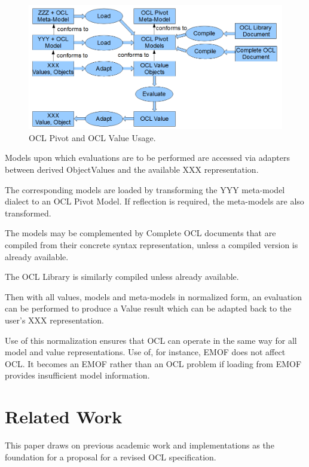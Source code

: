 \documentclass{eceasst}
\begin{document}
\begin{figure}
  \begin{center}
    \includegraphics[width=5.0in]{Usage.png}
  \end{center}
  \caption{OCL Pivot and OCL Value Usage.}
  \label{fig:Usage}
\end{figure}

Models upon which evaluations are to be performed are accessed via adapters between derived ObjectValues and the available XXX representation.

The corresponding models are loaded by transforming the YYY meta-model dialect to an OCL Pivot Model. If reflection is required, the meta-models are also transformed.

The models may be complemented by Complete OCL documents that are compiled from their concrete syntax representation, unless a compiled version is already available.

The OCL Library is similarly compiled unless already available.

Then with all values, models and meta-models in normalized form, an evaluation can be performed to produce a Value result which can be adapted back to the user's XXX representation.  

Use of this normalization ensures that OCL can operate in the same way for all model and value representations. Use of, for instance, EMOF does not affect OCL. It becomes an EMOF rather than an OCL problem if loading from EMOF provides insufficient model information.

\section{Related Work}

This paper draws on previous academic work and implementations as the foundation for a proposal for a revised OCL specification.
\end{document}
